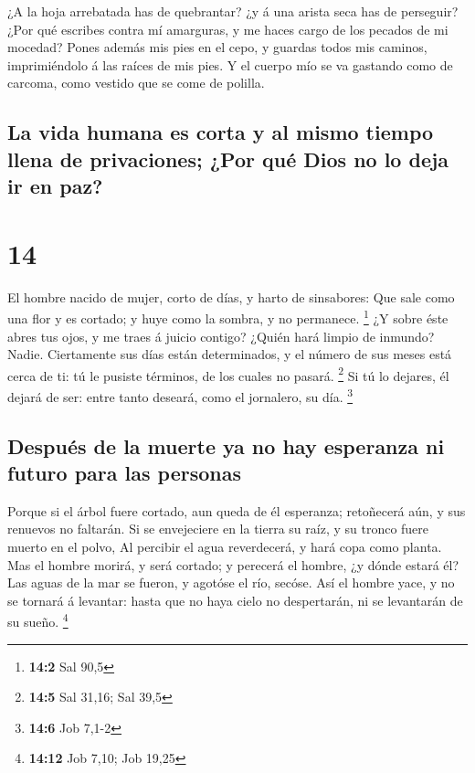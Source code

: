  ¿A la hoja arrebatada has de quebrantar? ¿y á una arista
seca has de perseguir?  ¿Por qué escribes contra mí
amarguras, y me haces cargo de los pecados de mi mocedad? 
Pones además mis pies en el cepo, y guardas todos mis caminos,
imprimiéndolo á las raíces de mis pies.  Y el cuerpo mío se
va gastando como de carcoma, como vestido que se come de polilla.

\hypertarget{la-vida-humana-es-corta-y-al-mismo-tiempo-llena-de-privaciones-por-quuxe9-dios-no-lo-deja-ir-en-paz}{%
\subsection{La vida humana es corta y al mismo tiempo llena de
privaciones; ¿Por qué Dios no lo deja ir en
paz?}\label{la-vida-humana-es-corta-y-al-mismo-tiempo-llena-de-privaciones-por-quuxe9-dios-no-lo-deja-ir-en-paz}}

\hypertarget{section-13}{%
\section{14}\label{section-13}}

 El hombre nacido de mujer, corto de días, y harto de
sinsabores:  Que sale como una flor y es cortado; y huye
como la sombra, y no permanece. \footnote{\textbf{14:2} Sal 90,5}
 ¿Y sobre éste abres tus ojos, y me traes á juicio contigo?
 ¿Quién hará limpio de inmundo? Nadie. 
Ciertamente sus días están determinados, y el número de sus meses está
cerca de ti: tú le pusiste términos, de los cuales no pasará.
\footnote{\textbf{14:5} Sal 31,16; Sal 39,5}  Si tú lo
dejares, él dejará de ser: entre tanto deseará, como el jornalero, su
día. \footnote{\textbf{14:6} Job 7,1-2}

\hypertarget{despuuxe9s-de-la-muerte-ya-no-hay-esperanza-ni-futuro-para-las-personas}{%
\subsection{Después de la muerte ya no hay esperanza ni futuro para las
personas}\label{despuuxe9s-de-la-muerte-ya-no-hay-esperanza-ni-futuro-para-las-personas}}

 Porque si el árbol fuere cortado, aun queda de él
esperanza; retoñecerá aún, y sus renuevos no faltarán.  Si
se envejeciere en la tierra su raíz, y su tronco fuere muerto en el
polvo,  Al percibir el agua reverdecerá, y hará copa como
planta.  Mas el hombre morirá, y será cortado; y perecerá
el hombre, ¿y dónde estará él?  Las aguas de la mar se
fueron, y agotóse el río, secóse.  Así el hombre yace, y no
se tornará á levantar: hasta que no haya cielo no despertarán, ni se
levantarán de su sueño. \footnote{\textbf{14:12} Job 7,10; Job 19,25}

